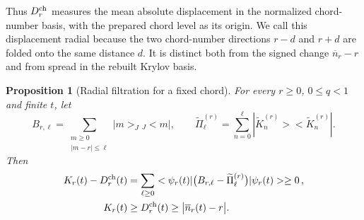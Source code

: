 \documentclass[a4paper,11pt]{article}
\def\ket#1{|#1>}%
\def\bra#1{<#1|}%
\def\Jac{J}%
\newtheorem{proposition}{Proposition}[section]
\theoremstyle{definition}
\theoremstyle{remark}
\newcommand{\ket}[1]{|#1\rangle}
\newcommand{\bra}[1]{\langle #1|}
\newcommand{\Jac}{\mathsf J}
\begin{document}
Thus $D_r^{\rm ch}$ measures the mean absolute displacement in the normalized
chord-number basis, with the prepared chord level as its origin.  We call this displacement radial
because the two chord-number directions $r-d$ and $r+d$ are folded onto the same distance $d$.  It
is distinct both from the signed change $\overline n_r-r$ and from spread in the rebuilt Krylov
basis.

\begin{proposition}[Radial filtration for a fixed chord]
\label{prop:chord-radial-filtration}
For every $r\ge0$, $0\le q<1$ and finite $t$, let
\begin{equation}
   B_{r,\ell}=\sum_{\substack{m\ge0\\ |m-r|\le\ell}}
      \ket m_{\Jac}{}_{\Jac}\!\bra m,
   \qquad
   \widetilde\Pi_{\ell}^{(r)}=
      \sum_{n=0}^{\ell}\ket{\widetilde K_n^{(r)}}
      \bra{\widetilde K_n^{(r)}}.
   \label{eq:chord-radial-projectors}
\end{equation}
Then
\begin{equation}
\begin{aligned}
   K_r(t)-D_r^{\rm ch}(t)
   &=\sum_{\ell\ge0}\bra{\psi_r(t)}
     \bigl(B_{r,\ell}-\widetilde\Pi_{\ell}^{(r)}\bigr)
     \ket{\psi_r(t)}\ge0\,,\\
   K_r(t)&\ge D_r^{\rm ch}(t)\ge
      \bigl|\overline n_r(t)-r\bigr|.
   \label{eq:chord-radial-filtration}
\end{aligned}
\end{equation}
\end{proposition}
\end{document}
